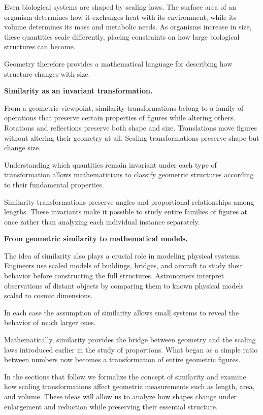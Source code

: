 \documentclass[11pt, openany]{book}
\theoremstyle{plain}
\theoremstyle{definition}
\theoremstyle{remark}
\begin{document}
Even biological systems are shaped by scaling laws. The surface area of
an organism determines how it exchanges heat with its environment,
while its volume determines its mass and metabolic needs. As organisms
increase in size, these quantities scale differently, placing
constraints on how large biological structures can become.

Geometry therefore provides a mathematical language for describing how
structure changes with size.

\medskip

\textbf{Similarity as an invariant transformation.}

From a geometric viewpoint, similarity transformations belong to a
family of operations that preserve certain properties of figures while
altering others. Rotations and reflections preserve both shape and
size. Translations move figures without altering their geometry at all.
Scaling transformations preserve shape but change size.

Understanding which quantities remain invariant under each type of
transformation allows mathematicians to classify geometric structures
according to their fundamental properties.

Similarity transformations preserve angles and proportional
relationships among lengths. These invariants make it possible to study
entire families of figures at once rather than analyzing each individual
instance separately.

\medskip

\textbf{From geometric similarity to mathematical models.}

The idea of similarity also plays a crucial role in modeling physical
systems. Engineers use scaled models of buildings, bridges, and aircraft
to study their behavior before constructing the full structures.
Astronomers interpret observations of distant objects by comparing them
to known physical models scaled to cosmic dimensions.

In each case the assumption of similarity allows small systems to reveal
the behavior of much larger ones.

Mathematically, similarity provides the bridge between geometry and the
scaling laws introduced earlier in the study of proportions. What began
as a simple ratio between numbers now becomes a transformation of
entire geometric figures.

\medskip

In the sections that follow we formalize the concept of similarity and
examine how scaling transformations affect geometric measurements such
as length, area, and volume. These ideas will allow us to analyze how
shapes change under enlargement and reduction while preserving their
essential structure.
\end{document}
